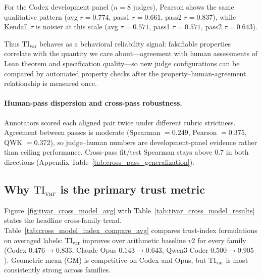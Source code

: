 \documentclass{article}
\begin{document}
For the Codex development panel (\(n=8\) judges), Pearson shows the same qualitative pattern (avg \(r=0.774\), pass1 \(r=0.661\), pass2 \(r=0.837\)), while Kendall \(\tau\) is noisier at this scale (avg \(\tau=0.571\), pass1 \(\tau=0.571\), pass2 \(\tau=0.643\)).

Thus \(\mathrm{TI}_{\mathrm{var}}\) behaves as a behavioral reliability signal: falsifiable properties correlate with the quantity we care about---agreement with human assessments of Lean theorem and specification quality---so new judge configurations can be compared by automated property checks after the property--human-agreement relationship is measured once.

\paragraph{Human-pass dispersion and cross-pass robustness.}
Annotators scored each aligned pair twice under different rubric strictness. Agreement between passes is moderate (Spearman \(=0.249\), Pearson \(=0.375\), QWK \(=0.372\)), so judge--human numbers are development-panel evidence rather than ceiling performance. Cross-pass fit/test Spearman stays above \(0.7\) in both directions (Appendix Table~\ref{tab:cross_pass_generalization}).

\subsection{Why \texorpdfstring{\(\mathrm{TI}_{\mathrm{var}}\)}{TI-var} is the primary trust metric}
Figure~\ref{fig:tivar_cross_model_avg} with Table~\ref{tab:tivar_cross_model_results} states the headline cross-family trend. Table~\ref{tab:cross_model_index_compare_avg} compares trust-index formulations on averaged labels: \(\mathrm{TI}_{\mathrm{var}}\) improves over arithmetic baseline \(v2\) for every family (Codex \(0.476\!\rightarrow\!0.833\), Claude Opus \(0.143\!\rightarrow\!0.643\), Qwen3-Coder \(0.500\!\rightarrow\!0.905\)). Geometric mean (GM) is competitive on Codex and Opus, but \(\mathrm{TI}_{\mathrm{var}}\) is most consistently strong across families.
\end{document}
